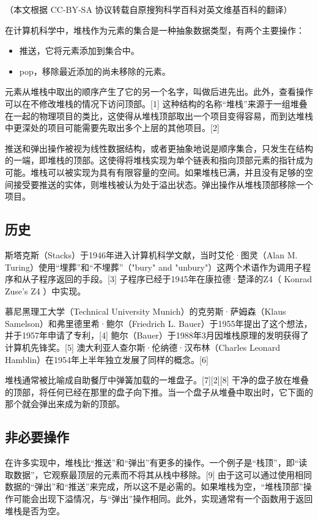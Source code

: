 
（本文根据 CC-BY-SA 协议转载自原搜狗科学百科对英文维基百科的翻译）

在计算机科学中，堆栈作为元素的集合是一种抽象数据类型，有两个主要操作：
\begin{itemize}
\item 推送，它将元素添加到集合中。
\item pop，移除最近添加的尚未移除的元素。
\end{itemize}
元素从堆栈中取出的顺序产生了它的另一个名字，叫做后进先出。此外，查看操作可以在不修改堆栈的情况下访问顶部。[1] 这种结构的名称“堆栈”来源于一组堆叠在一起的物理项目的类比，这使得从堆栈顶部取出一个项目变得容易，而到达堆栈中更深处的项目可能需要先取出多个上层的其他项目。[2]

推送和弹出操作被视为线性数据结构，或者更抽象地说是顺序集合，只发生在结构的一端，即堆栈的顶部。这使得将堆栈实现为单个链表和指向顶部元素的指针成为可能。堆栈可以被实现为具有有限容量的空间。如果堆栈已满，并且没有足够的空间接受要推送的实体，则堆栈被认为处于溢出状态。弹出操作从堆栈顶部移除一个项目。

\subsection{历史}
斯塔克斯（Stacks）于1946年进入计算机科学文献，当时艾伦·图灵（Alan M. Turing）使用“埋葬”和“不埋葬”（"bury" and "unbury"）这两个术语作为调用子程序和从子程序返回的手段。[3] 子程序已经于1945年在康拉德·楚泽的Z4（ Konrad Zuse's Z4 ）中实现。

慕尼黑理工大学（Technical University Munich）的克劳斯·萨姆森（Klaus Samelson）和弗里德里希·鲍尔（Friedrich L. Bauer）于1955年提出了这个想法，并于1957年申请了专利，[4] 鲍尔（Bauer）于1988年3月因堆栈原理的发明获得了计算机先锋奖。[5] 澳大利亚人查尔斯·伦纳德·汉布林（Charles Leonard Hamblin）在1954年上半年独立发展了同样的概念。[6]

堆栈通常被比喻成自助餐厅中弹簧加载的一堆盘子。[7][2][8] 干净的盘子放在堆叠的顶部，将任何已经在那里的盘子向下推。当一个盘子从堆叠中取出时，它下面的那个就会弹出来成为新的顶部。

\subsection{ 非必要操作}
在许多实现中，堆栈比“推送”和“弹出”有更多的操作。一个例子是“栈顶”，即“读取数据”，它观察最顶层的元素而不将其从栈中移除。[9] 由于这可以通过使用相同数据的“弹出”和“推送”来完成，所以这不是必需的。如果堆栈为空，“堆栈顶部”操作可能会出现下溢情况，与“弹出”操作相同。此外，实现通常有一个函数用于返回堆栈是否为空。

